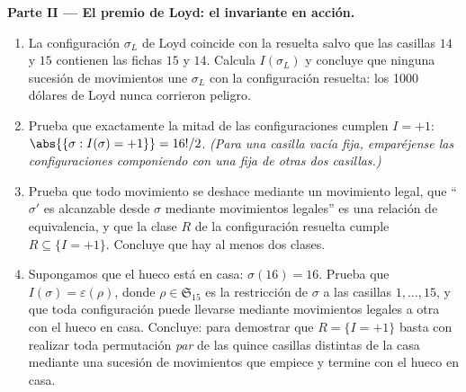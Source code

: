 \begin{problem}
\medskip
\noindent\textbf{Parte II --- El premio de Loyd: el invariante en
acción.}
\begin{enumerate}[resume]
  \item La configuración $\sigma_L$ de Loyd coincide con la
        resuelta salvo que las casillas $14$ y $15$ contienen las
        fichas $15$ y $14$. Calcula $I(\sigma_L)$ y concluye que
        ninguna sucesión de movimientos une $\sigma_L$ con la
        configuración resuelta: los 1000 dólares de Loyd nunca
        corrieron peligro.
  \item Prueba que exactamente la mitad de las configuraciones
        cumplen $I = +1$: $\abs{\{\sigma : I(\sigma) = +1\}} =
        16!/2$. \emph{(Para una casilla vacía fija, emparéjense
        las configuraciones componiendo con una 
        fija de otras dos casillas.)}
  \item Prueba que todo movimiento se deshace mediante un
        movimiento legal, que ``$\sigma'$ es alcanzable desde
        $\sigma$ mediante movimientos legales'' es una relación de
        equivalencia, y que la clase $R$ de la configuración
        resuelta cumple $R \subseteq \{I = +1\}$. Concluye que hay
        al menos dos clases.
  \item Supongamos que el hueco está en casa: $\sigma(16) = 16$.
        Prueba que $I(\sigma) = \varepsilon(\rho)$, donde $\rho
        \in \mathfrak{S}_{15}$ es la restricción de $\sigma$ a las
        casillas $1, \dots, 15$, y que toda configuración puede
        llevarse mediante movimientos legales a otra con el hueco
        en casa. Concluye: para demostrar que $R = \{I = +1\}$
        basta con realizar toda permutación \emph{par} de las
        quince casillas distintas de la casa mediante una sucesión
        de movimientos que empiece y termine con el hueco en casa.
\end{enumerate}


\end{problem}
